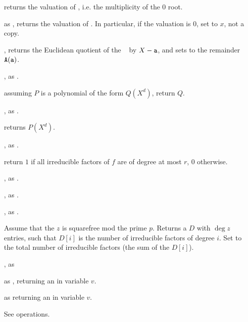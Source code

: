  returns the valuation of , i.e. the
multiplicity of the $0$ root.

 as , returns the
valuation of . In particular, if the valuation is $0$, set 
to $x$, not a copy.

, returns the
Euclidean quotient of the ~ by $X - {\tt a}$, and sets
 to the remainder $ {\tt A}({\tt a})$.

, as .

 assuming $P$ is a polynomial of the
form $Q(X^d)$, return $Q$.

, as .

 returns $P(X^d)$.


, as .

 return $1$ if all
irreducible factors of $f$ are of degree at most $r$, $0$ otherwise.

, as .

, as .

, as .

 Assume
that the  $z$ is squarefree mod the prime $p$. Returns a
 $D$ with $\deg z$ entries, such that $D[i]$ is the number of
irreducible factors of degree $i$. Set  to the total number of
irreducible factors (the sum of the $D[i]$).

,\hfil\break
as 

 as ,
returning an  in variable $v$.

 as
 returning an  in variable $v$.

 See  operations.

